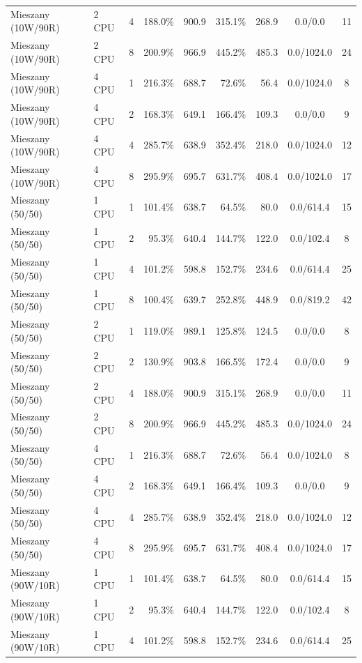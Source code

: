 \begin{table}[ht]
{\begin{tabular}{llcrrrrcc}
Mieszany (10W/90R) & 2 CPU & 4 & 188.0\% & 900.9 & 315.1\% & 268.9 & 0.0/0.0 & 11 \\
Mieszany (10W/90R) & 2 CPU & 8 & 200.9\% & 966.9 & 445.2\% & 485.3 & 0.0/1024.0 & 24 \\
Mieszany (10W/90R) & 4 CPU & 1 & 216.3\% & 688.7 & 72.6\% & 56.4 & 0.0/1024.0 & 8 \\
Mieszany (10W/90R) & 4 CPU & 2 & 168.3\% & 649.1 & 166.4\% & 109.3 & 0.0/0.0 & 9 \\
Mieszany (10W/90R) & 4 CPU & 4 & 285.7\% & 638.9 & 352.4\% & 218.0 & 0.0/1024.0 & 12 \\
Mieszany (10W/90R) & 4 CPU & 8 & 295.9\% & 695.7 & 631.7\% & 408.4 & 0.0/1024.0 & 17 \\
Mieszany (50/50) & 1 CPU & 1 & 101.4\% & 638.7 & 64.5\% & 80.0 & 0.0/614.4 & 15 \\
Mieszany (50/50) & 1 CPU & 2 & 95.3\% & 640.4 & 144.7\% & 122.0 & 0.0/102.4 & 8 \\
Mieszany (50/50) & 1 CPU & 4 & 101.2\% & 598.8 & 152.7\% & 234.6 & 0.0/614.4 & 25 \\
Mieszany (50/50) & 1 CPU & 8 & 100.4\% & 639.7 & 252.8\% & 448.9 & 0.0/819.2 & 42 \\
Mieszany (50/50) & 2 CPU & 1 & 119.0\% & 989.1 & 125.8\% & 124.5 & 0.0/0.0 & 8 \\
Mieszany (50/50) & 2 CPU & 2 & 130.9\% & 903.8 & 166.5\% & 172.4 & 0.0/0.0 & 9 \\
Mieszany (50/50) & 2 CPU & 4 & 188.0\% & 900.9 & 315.1\% & 268.9 & 0.0/0.0 & 11 \\
Mieszany (50/50) & 2 CPU & 8 & 200.9\% & 966.9 & 445.2\% & 485.3 & 0.0/1024.0 & 24 \\
Mieszany (50/50) & 4 CPU & 1 & 216.3\% & 688.7 & 72.6\% & 56.4 & 0.0/1024.0 & 8 \\
Mieszany (50/50) & 4 CPU & 2 & 168.3\% & 649.1 & 166.4\% & 109.3 & 0.0/0.0 & 9 \\
Mieszany (50/50) & 4 CPU & 4 & 285.7\% & 638.9 & 352.4\% & 218.0 & 0.0/1024.0 & 12 \\
Mieszany (50/50) & 4 CPU & 8 & 295.9\% & 695.7 & 631.7\% & 408.4 & 0.0/1024.0 & 17 \\
Mieszany (90W/10R) & 1 CPU & 1 & 101.4\% & 638.7 & 64.5\% & 80.0 & 0.0/614.4 & 15 \\
Mieszany (90W/10R) & 1 CPU & 2 & 95.3\% & 640.4 & 144.7\% & 122.0 & 0.0/102.4 & 8 \\
Mieszany (90W/10R) & 1 CPU & 4 & 101.2\% & 598.8 & 152.7\% & 234.6 & 0.0/614.4 & 25 \\

\end{tabular}}
\end{table}
